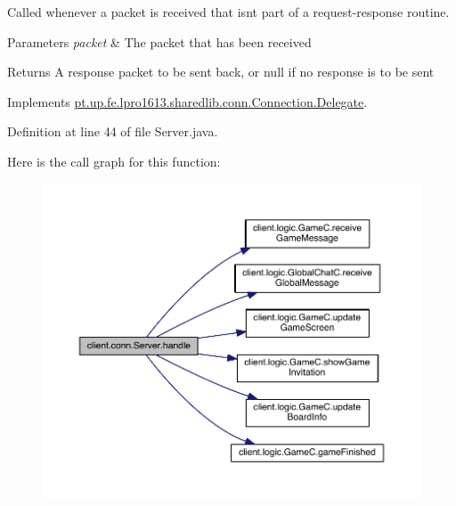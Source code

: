 Called whenever a packet is received that isn\textquotesingle{}t part of a request-\/response routine.


\begin{DoxyParams}{Parameters}
{\em packet} & The packet that has been received \\
\hline
\end{DoxyParams}
\begin{DoxyReturn}{Returns}
A response packet to be sent back, or null if no response is to be sent 
\end{DoxyReturn}


Implements \hyperlink{interfacept_1_1up_1_1fe_1_1lpro1613_1_1sharedlib_1_1conn_1_1_connection_1_1_delegate_a5b0f77e34d93967ae53cf7e01f0e2835}{pt.\+up.\+fe.\+lpro1613.\+sharedlib.\+conn.\+Connection.\+Delegate}.



Definition at line 44 of file Server.\+java.

Here is the call graph for this function\+:
\nopagebreak
\begin{figure}[H]
\begin{center}
\leavevmode
\includegraphics[width=350pt]{classclient_1_1conn_1_1_server_a620def50e5115d3798407dfff5433ead_cgraph}
\end{center}
\end{figure}
\hypertarget{classclient_1_1conn_1_1_server_a064556a987ee40eb0a91a952ae08969f}{}\label{classclient_1_1conn_1_1_server_a064556a987ee40eb0a91a952ae08969f} 
